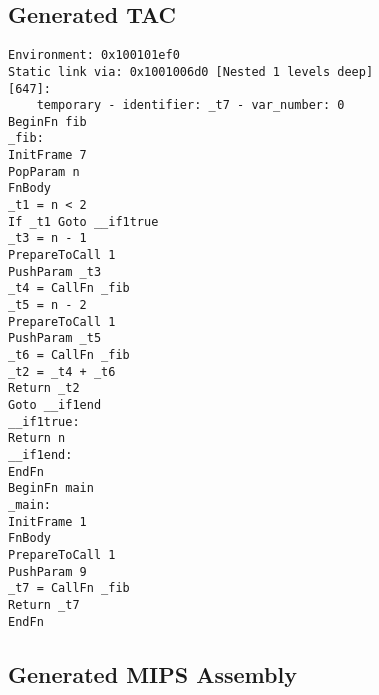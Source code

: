 \subsection{Generated TAC}
\begin{verbatim}
Environment: 0x100101ef0
Static link via: 0x1001006d0 [Nested 1 levels deep]
[647]:
	temporary - identifier: _t7 - var_number: 0
BeginFn fib
_fib:
InitFrame 7
PopParam n
FnBody
_t1 = n < 2
If _t1 Goto __if1true
_t3 = n - 1
PrepareToCall 1
PushParam _t3
_t4 = CallFn _fib
_t5 = n - 2
PrepareToCall 1
PushParam _t5
_t6 = CallFn _fib
_t2 = _t4 + _t6
Return _t2
Goto __if1end
__if1true:
Return n
__if1end:
EndFn
BeginFn main
_main:
InitFrame 1
FnBody
PrepareToCall 1
PushParam 9
_t7 = CallFn _fib
Return _t7
EndFn
\end{verbatim}\subsection{Generated MIPS Assembly}
